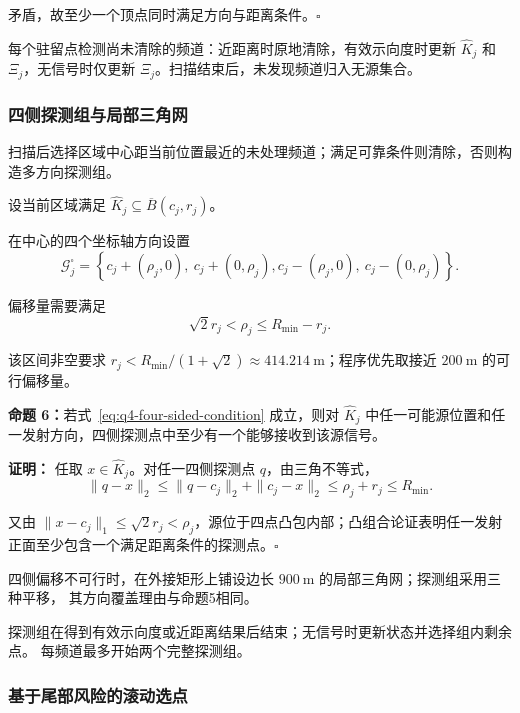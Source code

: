 矛盾，故至少一个顶点同时满足方向与距离条件。\hfill$\square$

每个驻留点检测尚未清除的频道：近距离时原地清除，有效示向度时更新 $\widehat K_j$ 和
$\Xi_j$，无信号时仅更新 $\Xi_j$。扫描结束后，未发现频道归入无源集合。

\subsubsection{四侧探测组与局部三角网}

扫描后选择区域中心距当前位置最近的未处理频道；满足可靠条件则清除，否则构造多方向探测组。

设当前区域满足 $\widehat K_j\subseteq\overline B(c_j,r_j)$。

在中心的四个坐标轴方向设置
\begin{equation}
  \mathcal G_j^{\square}=
  \left\{
  c_j+(\rho_j,0),\ c_j+(0,\rho_j),
  c_j-(\rho_j,0),\ c_j-(0,\rho_j)
  \right\}.
  \label{eq:q4-four-sided-points}
\end{equation}

偏移量需要满足
\begin{equation}
  \sqrt2r_j<\rho_j\leq R_{\min}-r_j.
  \label{eq:q4-four-sided-condition}
\end{equation}

该区间非空要求 $r_j<R_{\min}/(1+\sqrt2)\approx414.214\ \mathrm m$；程序优先取接近 $200\ \mathrm m$ 的可行偏移量。

\noindent\textbf{命题 6：}{\kaishu 若式~\eqref{eq:q4-four-sided-condition} 成立，则对 $\widehat K_j$ 中任一可能源位置和任一发射方向，四侧探测点中至少有一个能够接收到该源信号。}

\noindent\textbf{证明：}
任取 $x\in\widehat K_j$。对任一四侧探测点 $q$，由三角不等式，
\begin{equation}
  \|q-x\|_2
  \leq\|q-c_j\|_2+\|c_j-x\|_2
  \leq\rho_j+r_j\leq R_{\min}.
  \label{eq:q4-four-distance}
\end{equation}

又由 $\|x-c_j\|_1\leq\sqrt2r_j<\rho_j$，源位于四点凸包内部；凸组合论证表明任一发射
正面至少包含一个满足距离条件的探测点。\hfill$\square$

四侧偏移不可行时，在外接矩形上铺设边长 $900\ \mathrm m$ 的局部三角网；探测组采用三种平移，
其方向覆盖理由与命题5相同。

探测组在得到有效示向度或近距离结果后结束；无信号时更新状态并选择组内剩余点。
每频道最多开始两个完整探测组。

\subsubsection{基于尾部风险的滚动选点}

